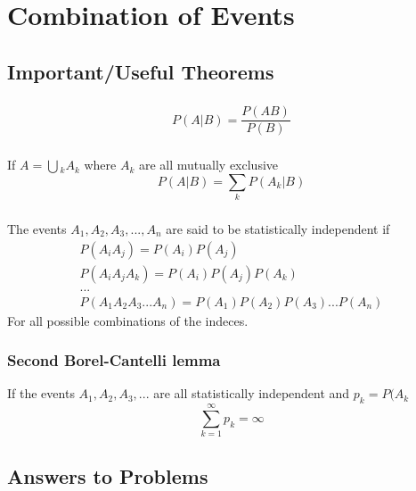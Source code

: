 
\chapter{Combination of Events}

\section{Important/Useful Theorems}

\subsection{}

\begin{equation}
	P(A|B) = \frac{P(AB)}{P(B)}
\end{equation}

\subsection{}
If $A = \bigcup{}_k A_k$ where $A_k$ are all mutually exclusive
\begin{equation}
	P(A|B) = \sum_k P(A_k|B)
\end{equation}

\subsection{}
The events $A_1, A_2, A_3, ..., A_n$ are said to be statistically independent if
\begin{eqnarray*}
	P(A_i A_j) = P(A_i)P(A_j) \\
	P(A_i A_j A_k) = P(A_i)P(A_j)P(A_k) \\
	... \\
	P(A_1 A_2 A_3...A_n) = P(A_1)P(A_2)P(A_3)...P(A_n)
\end{eqnarray*}
For all possible combinations of the indeces.

\subsection{Second Borel-Cantelli lemma}
If the events $A_1, A_2, A_3, ...$ are all statistically independent and $p_k = P(A_k$
\begin{equation}
	\sum_{k=1}^\infty p_k = \infty
\end{equation}


\section{Answers to Problems}

